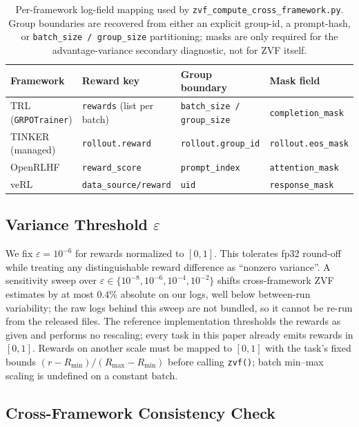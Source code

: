 \begin{table}[ht]
\centering
\small
\begin{tabular}{llll}
\toprule
Framework & Reward key & Group boundary & Mask field \\
\midrule
TRL (\texttt{GRPOTrainer})   & \texttt{rewards} (list per batch) & \texttt{batch\_size / group\_size} & \texttt{completion\_mask} \\
TINKER (managed)             & \texttt{rollout.reward}           & \texttt{rollout.group\_id}         & \texttt{rollout.eos\_mask} \\
OpenRLHF                     & \texttt{reward\_score}            & \texttt{prompt\_index}             & \texttt{attention\_mask}   \\
veRL                         & \texttt{data\_source/reward}      & \texttt{uid}                        & \texttt{response\_mask}   \\
\bottomrule
\end{tabular}
\caption{Per-framework log-field mapping used by
\texttt{zvf\_compute\_cross\_framework.py}. Group boundaries are recovered
from either an explicit group-id, a prompt-hash, or
\texttt{batch\_size / group\_size} partitioning; masks are only required
for the advantage-variance secondary diagnostic, not for ZVF itself.}
\label{tab:zvf-parser-fields}
\end{table}

\subsection{Variance Threshold \texorpdfstring{$\varepsilon$}{epsilon}}

We fix $\varepsilon = 10^{-6}$ for rewards normalized to $[0,1]$. This
tolerates fp32 round-off while treating any distinguishable reward
difference as ``nonzero variance''. A sensitivity sweep over
$\varepsilon \in \{10^{-8}, 10^{-6}, 10^{-4}, 10^{-2}\}$ shifts
cross-framework ZVF estimates by at most $0.4\%$ absolute on our logs,
well below between-run variability; the raw logs behind this sweep are not
bundled, so it cannot be re-run from the released files. The reference implementation thresholds
the rewards as given and performs no rescaling; every task in this paper already
emits rewards in $[0,1]$. Rewards on another scale must be mapped to $[0,1]$ with
the task's fixed bounds $(r-R_{\min})/(R_{\max}-R_{\min})$ before calling
\texttt{zvf()}; batch min--max scaling is undefined on a constant batch.

\subsection{Cross-Framework Consistency Check}


